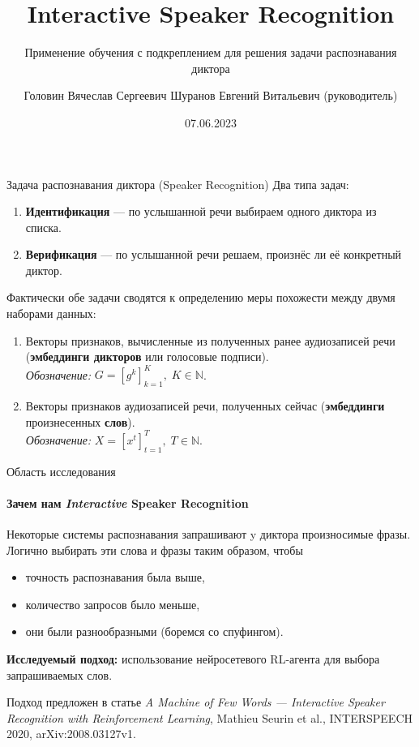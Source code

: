 \documentclass[aspectratio=43]{beamer}
\title{Interactive Speaker Recognition}
\subtitle{Применение обучения с подкреплением для решения задачи распознавания
          диктора}
\author[В.С.~Головин]{Головин Вячеслав Сергеевич \texorpdfstring{\newline}{, }
    {\small Шуранов Евгений Витальевич (руководитель)}}
\institute[ВШЭ]{Huawei CBG AI и ФКН ВШЭ СПб}
\date{07.06.2023}
\begin{document}
\frame{\titlepage}

\begin{frame}{Задача распознавания диктора (Speaker Recognition)}
    Два типа задач:
    \begin{enumerate}
        \item \textbf{Идентификация} --- по услышанной речи выбираем одного диктора из списка.
        \item \textbf{Верификация} --- по услышанной речи решаем, произнёс ли её конкретный диктор.
    \end{enumerate}\vspace{1em}

    Фактически обе задачи сводятся к определению меры похожести между двумя
    наборами данных:
    \begin{enumerate}
        \item Векторы признаков, вычисленные из полученных ранее аудиозаписей речи
        (\textbf{эмбеддинги дикторов} или голосовые подписи).\\
        \textit{Обозначение:} $G = {[g^k]}_{k=1}^K, \; K \in \mathbb{N}$.
        \item Векторы признаков аудиозаписей речи, полученных сейчас
        (\textbf{эмбеддинги} произнесенных \textbf{слов}).\\
        \textit{Обозначение:} $X = {[x^t]}_{t=1}^T, \; T \in \mathbb{N}$.
    \end{enumerate}
\end{frame}

\begin{frame}{Область исследования}
    \framesubtitle{Зачем нам \emph{Interactive} Speaker Recognition}
    Некоторые системы распознавания запрашивают y диктора произносимые фразы.
    Логично выбирать эти слова и фразы таким образом, чтобы
    \begin{itemize}
        \item точность распознавания была выше,
        \item количество запросов было меньше,
        \item они были разнообразными (боремся со спуфингом).
    \end{itemize}\vspace{1em}

    \textbf{Исследуемый подход:} использование нейросетевого RL-агента для
    выбора запрашиваемых слов.\vspace{1em}

    Подход предложен в статье \textit{A Machine of Few Words --- Interactive
    Speaker Recognition with Reinforcement Learning}, Mathieu Seurin et al.,
    INTERSPEECH 2020, arXiv:2008.03127v1.
\end{frame}
\end{document}
